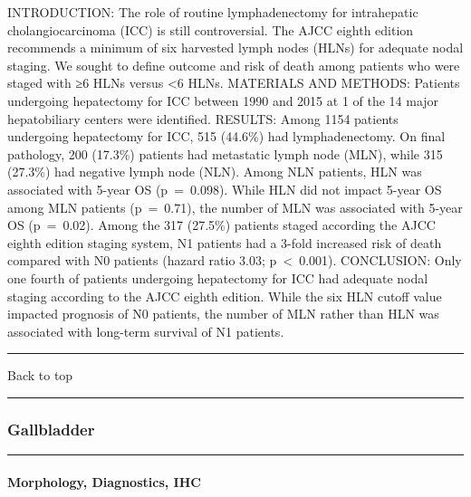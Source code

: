 \documentclass[]{article}
\let\oldparagraph\paragraph
\renewcommand{\paragraph}[1]{\oldparagraph{#1}\mbox{}}
\begin{document}
INTRODUCTION: The role of routine lymphadenectomy for intrahepatic
cholangiocarcinoma (ICC) is still controversial. The AJCC eighth edition
recommends a minimum of six harvested lymph nodes (HLNs) for adequate
nodal staging. We sought to define outcome and risk of death among
patients who were staged with ≥6 HLNs versus \textless{}6 HLNs.
MATERIALS AND METHODS: Patients undergoing hepatectomy for ICC between
1990 and 2015 at 1 of the 14 major hepatobiliary centers were
identified. RESULTS: Among 1154 patients undergoing hepatectomy for ICC,
515 (44.6\%) had lymphadenectomy. On final pathology, 200 (17.3\%)
patients had metastatic lymph node (MLN), while 315 (27.3\%) had
negative lymph node (NLN). Among NLN patients, HLN was associated with
5-year OS (p~=~0.098). While HLN did not impact 5-year OS among MLN
patients (p~=~0.71), the number of MLN was associated with 5-year OS
(p~=~0.02). Among the 317 (27.5\%) patients staged according the AJCC
eighth edition staging system, N1 patients had a 3-fold increased risk
of death compared with N0 patients (hazard ratio 3.03;
p~\textless{}~0.001). CONCLUSION: Only one fourth of patients undergoing
hepatectomy for ICC had adequate nodal staging according to the AJCC
eighth edition. While the six HLN cutoff value impacted prognosis of N0
patients, the number of MLN rather than HLN was associated with
long-term survival of N1 patients.

{}

{}

\begin{center}\rule{0.5\linewidth}{\linethickness}\end{center}

Back to top

\begin{center}\rule{0.5\linewidth}{\linethickness}\end{center}

\pagebreak

\hypertarget{gallbladder}{%
\subsubsection{Gallbladder}\label{gallbladder}}

\begin{center}\rule{0.5\linewidth}{\linethickness}\end{center}

\hypertarget{morphology-diagnostics-ihc-2}{%
\paragraph{Morphology, Diagnostics,
IHC}\label{morphology-diagnostics-ihc-2}}
\end{document}
